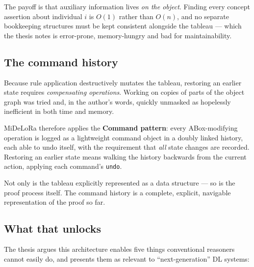 \documentclass[11pt,a4paper,DIV=12,parskip=half]{scrartcl}
\newenvironment{note}
  {\begin{list}{}{\setlength{\leftmargin}{1.5em}\setlength{\rightmargin}{1.5em}%
                  \setlength{\listparindent}{0pt}}\item[]\small}
  {\end{list}}
\begin{document}
The payoff is that auxiliary information lives \emph{on the object}. Finding
every concept assertion about individual $i$ is $O(1)$ rather than $O(n)$, and no
separate bookkeeping structures must be kept consistent alongside the tableau ---
which the thesis notes is error-prone, memory-hungry and bad for maintainability.

\subsection{The command history}

Because rule application destructively mutates the tableau, restoring an earlier
state requires \emph{compensating operations}. Working on copies of parts of the
object graph was tried and, in the author's words, quickly unmasked as hopelessly
inefficient in both time and memory.

MiDeLoRa therefore applies the \textbf{Command pattern}: every ABox-modifying
operation is logged as a lightweight command object in a doubly linked history,
each able to undo itself, with the requirement that \emph{all} state changes are
recorded. Restoring an earlier state means walking the history backwards from
the current action, applying each command's \texttt{undo}.

\begin{note}
Not only is the tableau explicitly represented as a data structure --- so is the
proof process itself. The command history is a complete, explicit, navigable
representation of the proof so far.
\end{note}

\subsection{What that unlocks}

The thesis argues this architecture enables five things conventional reasoners
cannot easily do, and presents them as relevant to \enquote{next-generation} DL
systems:
\end{document}
